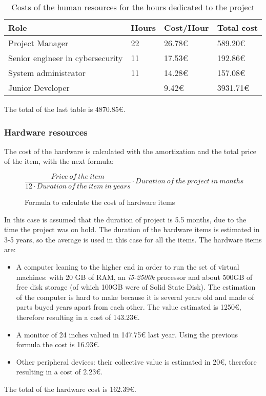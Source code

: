 \begin{table}[H]
	\begin{tabularx}{\textwidth}{|X|l|l|l|}
		\hline
		\rowcolor{gray!30}
		Role & Hours & Cost/Hour & Total cost\\ \hline
		Project Manager & 22 & 26.78\euro{}& 589.20\euro{}\\ \hline
		Senior engineer in cybersecurity & 11 & 17.53\euro{}& 192.86\euro{}\\ \hline
		System administrator & 11 & 14.28\euro{}& 157.08\euro{}\\ \hline
		Junior Developer & \projecthours & 9.42\euro{}& 3931.71\euro{}\\ \hline
	\end{tabularx}
	\caption{Costs of the human resources for the hours dedicated to the project}
\end{table}
\linej
The total of the last table is 4870.85\euro{}.

\subsubsection{Hardware resources}
The cost of the hardware is calculated with the amortization and the total price of the item, with the next formula:
\begin{figure}[H]
	\[ \frac{Price\ of\ the\ item}{12 \cdot Duration\ of\ the\ item\ in\ years} \cdot Duration\ of\ the\ project\ in\ months\ \]
	\caption{Formula to calculate the cost of hardware items}
\end{figure}
\linej
In this case is assumed that the duration of project is 5.5 months, due to the time the project was on hold.
The duration of the hardware items is estimated in 3-5 years, so the average is used in this case for all the items.
\linej
\linej
The hardware items are:
\begin{itemize}
	\item A computer leaning to the higher end in order to run the set of virtual machines: with 20 GB of RAM, an \textit{i5-2500k} processor and about 500GB of free disk storage (of which 100GB were of Solid State Disk). The estimation of the computer is hard to make because it is several years old and made of parts buyed years apart from each other. The value estimated is 1250\euro{}, therefore resulting in a cost of 143.23\euro{}.
	\item A monitor of 24 inches valued in 147.75\euro{} last year. Using the previous formula the cost is 16.93\euro{}.
	\item Other peripheral devices: their collective value is estimated in 20\euro{}, therefore resulting in a cost of 2.23\euro{}.
\end{itemize}
\linej
The total of the hardware cost is 162.39\euro{}.

